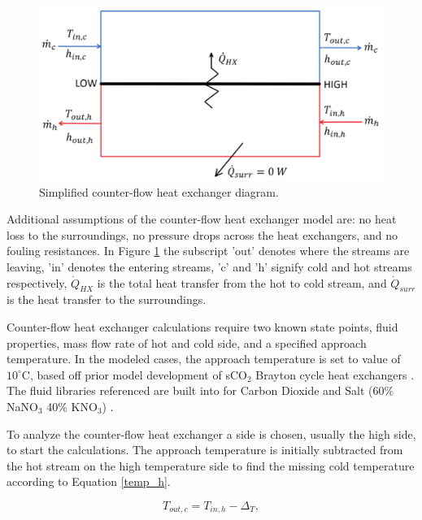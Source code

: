 \begin{figure}[h]
    \widefigure
    \includegraphics[width=10 cm]{Definitions/counter-flow-hx.pdf}
    \caption{Simplified counter-flow heat exchanger diagram. \label{counter-flow-hx}}
\end{figure}

Additional assumptions of the counter-flow heat exchanger model are: no heat loss to the surroundings, no pressure drops across the heat exchangers, and no fouling resistances. In Figure \ref{counter-flow-hx} the subscript 'out' denotes where the streams are leaving, 'in' denotes the entering streams, 'c' and 'h' signify cold and hot streams respectively, $\dot{Q}_{HX}$ is the total heat transfer from the hot to cold stream, and $\dot{Q}_{surr}$ is the heat transfer to the surroundings.

Counter-flow heat exchanger calculations require two known state points, fluid properties, mass flow rate of hot and cold side, and a specified approach temperature. In the modeled cases, the approach temperature is set to value of $10^{\circ}$C, based off prior model development of sCO$_{2}$ Brayton cycle heat exchangers \cite{seidel_2010_model_development}. The fluid libraries referenced are built into  for Carbon Dioxide and Salt (60\% NaNO$_3$ 40\% KNO$_3$) \cite{pacheco_1995_salt_properties,roland_1996_co2_properties}. 

To analyze the counter-flow heat exchanger a side is chosen, usually the high side, to start the calculations. The approach temperature is initially subtracted from the hot stream on the high temperature side to find the missing cold temperature according to Equation \ref{temp_h}. 

\begin{equation}
   \label{temp_h}
    T_{out,c} = T_{in,h}-\Delta_{T},
\end{equation}

